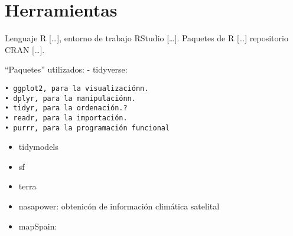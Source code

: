 \documentclass[12pt,a4paper,]{book}
\numberwithin{dummy}{section}
\theoremstyle{ocrenumbox}
\theoremstyle{blacknumex}
\theoremstyle{blacknumbox}
\theoremstyle{ocrenum}
\theoremstyle{ocrenum}
\begin{document}
\hypertarget{herramientas}{%
\section{Herramientas}\label{herramientas}}

Lenguaje R {[}\ldots{]}, entorno de trabajo RStudio {[}\ldots{]}.
Paquetes de R {[}\ldots{]} repositorio CRAN {[}\ldots{]}.

``Paquetes'' utilizados: - tidyverse:

\begin{verbatim}
• ggplot2, para la visualizaciónn.
• dplyr, para la manipulaciónn.
• tidyr, para la ordenación.?
• readr, para la importación.
• purrr, para la programación funcional
\end{verbatim}

\begin{itemize}
\item
  tidymodels
\item
  sf
\item
  terra
\item
  nasapower: obtenicón de información climática satelital
\item
  mapSpain:
\end{itemize}




%
\end{document}
